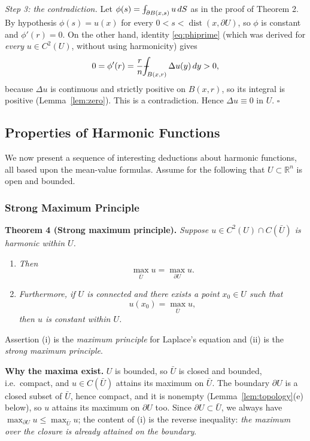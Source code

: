 \documentclass[11pt]{article}
\def\Xint#1{\mathchoice
  {\XXint\displaystyle\textstyle{#1}}%
  {\XXint\textstyle\scriptstyle{#1}}%
  {\XXint\scriptstyle\scriptscriptstyle{#1}}%
  {\XXint\scriptscriptstyle\scriptscriptstyle{#1}}%
  \!\int}
\def\XXint#1#2#3{{\setbox0=\hbox{$#1{#2#3}{\int}$}
  \vcenter{\hbox{$#2#3$}}\kern-.5\wd0}}
\def\fint{\Xint-}
\theoremstyle{plain}
\theoremstyle{definition}
\theoremstyle{remark}
\begin{document}
\emph{Step 3: the contradiction.} Let $\phi(s) = \fint_{\partial B(x,s)} u\, dS$ as in the proof of Theorem 2. By hypothesis $\phi(s) = u(x)$ for every $0 < s < \operatorname{dist}(x,\partial U)$, so $\phi$ is constant and $\phi'(r) = 0$. On the other hand, identity \eqref{eq:phiprime} (which was derived for \emph{every} $u \in C^2(U)$, without using harmonicity) gives
$$ 0 = \phi'(r) = \frac{r}{n}\fint_{B(x,r)} \Delta u(y)\, dy > 0, $$
because $\Delta u$ is continuous and strictly positive on $B(x,r)$, so its integral is positive (Lemma~\ref{lem:zero}). This is a contradiction. Hence $\Delta u \equiv 0$ in $U$. $\square$

\subsection{Properties of Harmonic Functions}
We now present a sequence of interesting deductions about harmonic functions, all based upon the mean-value formulas. Assume for the following that $U \subset \mathbb{R}^n$ is open and bounded.

\subsubsection{Strong Maximum Principle}
\textbf{Theorem 4 (Strong maximum principle).} \textit{Suppose $u \in C^2(U) \cap C(\bar U)$ is harmonic within $U$.}
\begin{enumerate}
    \item[(i)] \textit{Then}
    $$ \max_{\bar U} u = \max_{\partial U} u. $$
    \item[(ii)] \textit{Furthermore, if $U$ is connected and there exists a point $x_0 \in U$ such that}
    $$ u(x_0) = \max_{\bar U} u, $$
    \textit{then $u$ is constant within $U$.}
\end{enumerate}

Assertion (i) is the \emph{maximum principle} for Laplace's equation and (ii) is the \emph{strong maximum principle}.

\textbf{Why the maxima exist.} $U$ is bounded, so $\bar U$ is closed and bounded, i.e.\ compact, and $u \in C(\bar U)$ attains its maximum on $\bar U$. The boundary $\partial U$ is a closed subset of $\bar U$, hence compact, and it is nonempty (Lemma~\ref{lem:topology}(e) below), so $u$ attains its maximum on $\partial U$ too. Since $\partial U \subset \bar U$, we always have $\max_{\partial U} u \leq \max_{\bar U} u$; the content of (i) is the reverse inequality: \emph{the maximum over the closure is already attained on the boundary}.
\end{document}
